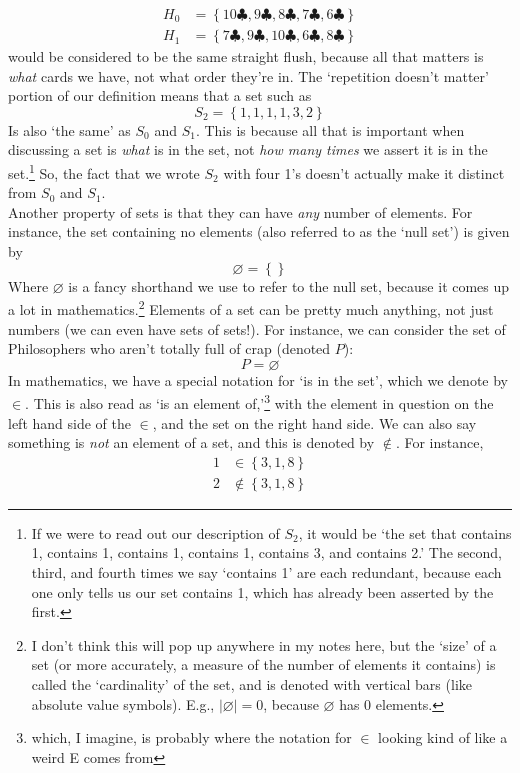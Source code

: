 \documentclass[10pt]{article}
\theoremstyle{definition}
\newcommand{\set}[1]{\left\{ #1 \right\}}
\begin{document}
\begin{align*}
H_0 &= \set{10\clubsuit,9\clubsuit, 8\clubsuit, 7\clubsuit, 6\clubsuit}\\
H_1 &= \set{7\clubsuit,9\clubsuit, 10\clubsuit, 6\clubsuit, 8\clubsuit}
\end{align*}
would be considered to be the same straight flush, because all that matters is \emph{what} cards we have, not what order they're in.  The `repetition doesn't matter' portion of our definition means that a set such as
\[S_2 = \set{1,1,1,1,3,2}\] 
Is also `the same' as $S_0$ and $S_1$.  This is because all that is important when discussing a set is \emph{what} is in the set, not \emph{how many times} we assert it is in the set.\footnote{If we were to read out our description of $S_2$, it would be `the set that contains 1, contains 1, contains 1, contains 1, contains 3, and contains 2.'  The second, third, and fourth times we say `contains 1' are each redundant, because each one only tells us our set contains 1, which has already been asserted by the first.}  So, the fact that we wrote $S_2$ with four 1's doesn't actually make it distinct from $S_0$ and $S_1$.  
\\
Another property of sets is that they can have \emph{any} number of elements.  For instance, the set containing no elements (also referred to as the `null set') is given by 
\[\varnothing = \set{}\]
Where $\varnothing$ is a fancy shorthand we use to refer to the null set, because it comes up a lot in mathematics.\footnote{I don't think this will pop up anywhere in my notes here, but the `size' of a set (or more accurately, a measure of the number of elements it contains) is called the `cardinality' of the set, and is denoted with vertical bars (like absolute value symbols).  E.g., $|\varnothing| = 0$, because $\varnothing$ has 0 elements.}  
Elements of a set can be pretty much anything, not just numbers (we can even have sets of sets!).  For instance, we can consider the set of Philosophers who aren't totally full of crap (denoted $P$): 
\[P = \varnothing\]
In mathematics, we have a special notation for `is in the set', which we denote by $\in$.  This is also read as `is an element of,'\footnote{which, I imagine, is probably where the notation for $\in$ looking kind of like a weird E comes from} with the element in question on the left hand side of the $\in$, and the set on the right hand side.  We can also say something is \emph{not} an element of a set, and this is denoted by $\notin$.  For instance, 
\begin{align*}
1&\in\set{3,1,8}\\
2&\notin\set{3,1,8}
\end{align*}
\end{document}
